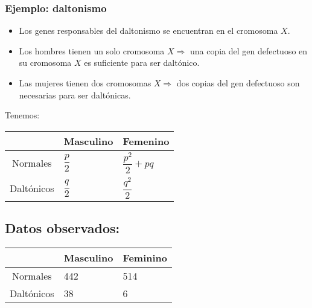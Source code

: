 \subsubsection*{Ejemplo: daltonismo}
\begin{tcolorbox}[colback=blue!5!white, colframe=blue!75!black, title=\textbf{La incidencia del daltonismo depende del sexo:}]
\begin{itemize}[label=\textbullet]
    \item Los genes responsables del daltonismo se encuentran en el cromosoma $X$.
    \item Los hombres tienen un solo cromosoma  $X\Longrightarrow $ una copia del gen defectuoso en su cromosoma $X$ es suficiente para ser daltónico.
    \item Las mujeres tienen dos cromosomas  $X\Longrightarrow $ dos copias del gen defectuoso son necesarias para ser daltónicas.
\end{itemize}
\end{tcolorbox}
\begin{tcolorbox}[colback=blue!5!white, colframe=blue!75!black, title=\textbf{Si llamamos $q$ a la probabilidad de que el cromosoma  $X$ tenga el gen defectuoso y  $p=1-q$.}]
Tenemos:
\begin{center}
    \begin{tabular}{cll}
      & \textbf{Masculino} & \textbf{Femenino}\\ \hline
        Normales & $\dfrac{p}{2}$ & $\dfrac{p^2}{2}+pq$\\ \hline
        Daltónicos & $\dfrac{q}{2}$ & $\dfrac{q^2}{2}$
 \end{tabular}   
\end{center}
\end{tcolorbox}
\subsection*{Datos observados:}
\begin{tcolorbox}[colback=blue!5!white, colframe=blue!75!black, title=\textbf{Para una muestra de 1000 personas:}]
\begin{center}
    \begin{tabular}{cll}
        & \textbf{Masculino} & \textbf{Feminino} \\ \hline
        Normales & 442 & 514\\
        Daltónicos & 38 & 6\\
    \end{tabular}
\end{center}
\end{tcolorbox}

